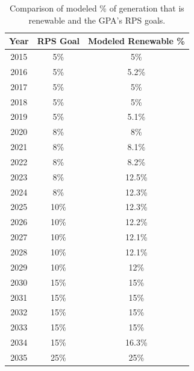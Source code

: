 \documentclass[12pt,letterpaper,fleqn]{article}
\begin{document}
\begin{table}[!h]
  \begin{center}
    \begin{tabular}{| c | c | c | }
      \hline
      \textbf{Year} & \textbf{RPS Goal} & \textbf{Modeled Renewable
        \%} \\\hline
      2015 & 5\% & 5\% \\\hline
      2016 & 5\% & 5.2\% \\\hline
      2017 & 5\% & 5\% \\\hline
      2018 & 5\% & 5\% \\\hline
      2019 & 5\% & 5.1\% \\\hline
      2020 & 8\% & 8\% \\\hline
      2021 & 8\% & 8.1\% \\\hline
      2022 & 8\% & 8.2\% \\\hline
      2023 & 8\% & 12.5\% \\\hline
      2024 & 8\% & 12.3\% \\\hline
      2025 & 10\% & 12.3\% \\\hline
      2026 & 10\% & 12.2\% \\\hline
      2027 & 10\% & 12.1\% \\\hline
      2028 & 10\% & 12.1\% \\\hline
      2029 & 10\% & 12\% \\\hline
      2030 & 15\% & 15\% \\\hline
      2031 & 15\% & 15\% \\\hline
      2032 & 15\% & 15\% \\\hline
      2033 & 15\% & 15\% \\\hline
      2034 & 15\% & 16.3\% \\\hline
      2035 & 25\% & 25\% \\\hline
    \end{tabular}
  \end{center}
  \caption{Comparison of modeled \% of generation that is renewable
    and the GPA's RPS goals.}
  \label{tab:rps}
\end{table}
\end{document}
